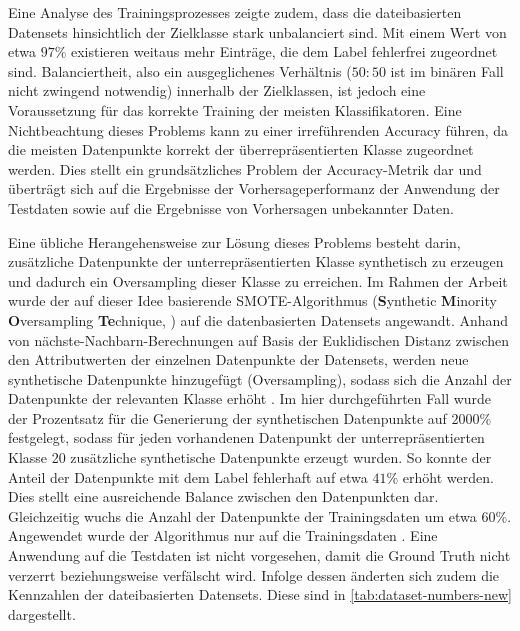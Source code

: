 \label{smote}
Eine Analyse des Trainingsprozesses zeigte zudem, dass die dateibasierten Datensets hinsichtlich der Zielklasse stark unbalanciert sind. Mit einem Wert von etwa $97\%$ existieren weitaus mehr Einträge, die dem Label \glqq fehlerfrei\grqq{} zugeordnet sind. Balanciertheit, also ein ausgeglichenes Verhältnis ($50:50$ ist im binären Fall nicht zwingend notwendig) innerhalb der Zielklassen, ist jedoch eine Voraussetzung für das korrekte Training der meisten Klassifikatoren. Eine Nichtbeachtung dieses Problems kann zu einer irreführenden Accuracy führen, da die meisten Datenpunkte korrekt der überrepräsentierten Klasse zugeordnet werden. Dies stellt ein grundsätzliches Problem der Accuracy-Metrik dar und überträgt sich auf die Ergebnisse der Vorhersageperformanz der Anwendung der Testdaten sowie auf die Ergebnisse von Vorhersagen unbekannter Daten. 

Eine übliche Herangehensweise zur Lösung dieses Problems besteht darin, zusätzliche Datenpunkte der unterrepräsentierten Klasse synthetisch zu erzeugen und dadurch ein Oversampling dieser Klasse zu erreichen. Im Rahmen der Arbeit wurde der auf dieser Idee basierende SMOTE-Algorithmus (\textbf{S}ynthetic \textbf{M}inority \textbf{O}versampling \textbf{Te}chnique, \cite{Chawla2002}) auf die datenbasierten Datensets angewandt. Anhand von nächste-Nachbarn-Berechnungen auf Basis der Euklidischen Distanz zwischen den Attributwerten der einzelnen Datenpunkte der Datensets, werden neue synthetische Datenpunkte hinzugefügt (Oversampling), sodass sich die Anzahl der Datenpunkte der relevanten Klasse erhöht \cite{Chawla2002}. Im hier durchgeführten Fall wurde der Prozentsatz für die Generierung der synthetischen Datenpunkte auf $2000\%$ festgelegt, sodass für jeden vorhandenen Datenpunkt der unterrepräsentierten Klasse 20 zusätzliche synthetische Datenpunkte erzeugt wurden. So konnte der Anteil der Datenpunkte mit dem Label \glqq fehlerhaft\grqq{} auf etwa $41\%$ erhöht werden. Dies stellt eine ausreichende Balance zwischen den Datenpunkten dar. Gleichzeitig wuchs die Anzahl der Datenpunkte der Trainingsdaten um etwa $60\%$. Angewendet wurde der Algorithmus nur auf die Trainingsdaten \cite{Chawla2002}. Eine Anwendung auf die Testdaten ist nicht vorgesehen, damit die \glqq Ground Truth\grqq{} nicht verzerrt beziehungsweise verfälscht wird. Infolge dessen änderten sich zudem die Kennzahlen der dateibasierten Datensets. Diese sind in \autoref{tab:dataset-numbers-new} dargestellt.

